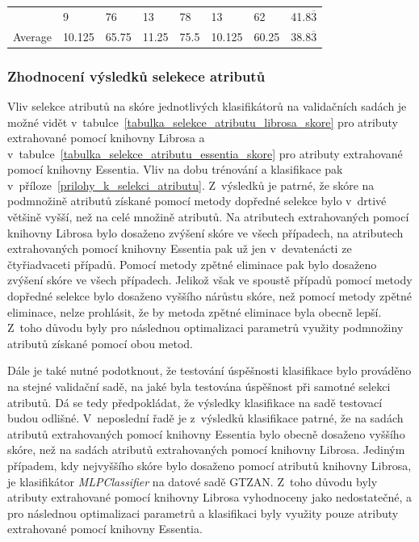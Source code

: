 \begin{table}[H]
{\begin{tabular}{llllllll}
    \rowcolor[HTML]{EFEFEF} 
    \multicolumn{1}{l|}{\cellcolor[HTML]{EFEFEF}XGBClassifier}          & 9       & 76                            & 13      & 78                            & 13      & 62                            & 41.8$\overline{3}$          \\
    \multicolumn{1}{l|}{Average}                                        & 10.125  & 65.75                         & 11.25   & 75.5                          & 10.125  & 60.25                         & 38.8$\overline{3}$         
    \end{tabular}}
\end{table}

\subsubsection*{Zhodnocení výsledků selekece atributů}
\label{NIS_zhodnoceni_vysledku_selekce_atributu}
Vliv selekce atributů na skóre jednotlivých klasifikátorů na validačních sadách je možné vidět v~tabulce~\ref{tabulka_selekce_atributu_librosa_skore} pro atributy extrahované pomocí knihovny Librosa a v~tabulce~\ref{tabulka_selekce_atributu_essentia_skore} pro atributy extrahované pomocí knihovny Essentia. Vliv na dobu trénování a klasifikace pak v~příloze~\ref{prilohy_k_selekci_atributu}. Z~výsledků je patrné, že skóre na podmnožině atributů získané pomocí metody dopředné selekce bylo v~drtivé většině vyšší, než na celé množině atributů. Na atributech extrahovaných pomocí knihovny Librosa bylo dosaženo zvýšení skóre ve všech případech, na atributech extrahovaných pomocí knihovny Essentia pak už jen v~devatenácti ze čtyřiadvaceti případů. Pomocí metody zpětné eliminace pak bylo dosaženo zvýšení skóre ve všech případech. Jelikož však ve spoustě případů pomocí metody dopředné selekce bylo dosaženo vyššího nárůstu skóre, než pomocí metody zpětné eliminace, nelze prohlásit, že by metoda zpětné eliminace byla obecně lepší. Z~toho důvodu byly pro následnou optimalizaci parametrů využity podmnožiny atributů získané pomocí obou metod.

Dále je také nutné podotknout, že testování úspěšnosti klasifikace bylo prováděno na stejné validační sadě, na jaké byla testována úspěšnost při samotné selekci atributů. Dá se tedy předpokládat, že výsledky klasifikace na sadě testovací budou odlišné. V~neposlední řadě je z~výsledků klasifikace patrné, že na sadách atributů extrahovaných pomocí knihovny Essentia bylo obecně dosaženo vyššího skóre, než na sadách atributů extrahovaných pomocí knihovny Librosa. Jediným případem, kdy nejvyššího skóre bylo dosaženo pomocí atributů knihovny Librosa, je klasifikátor \textit{MLPClassifier} na datové sadě GTZAN. Z~toho důvodu byly atributy extrahované pomocí knihovny Librosa vyhodnoceny jako nedostatečné, a pro následnou optimalizaci parametrů a klasifikaci byly využity pouze atributy extrahované pomocí knihovny Essentia.


